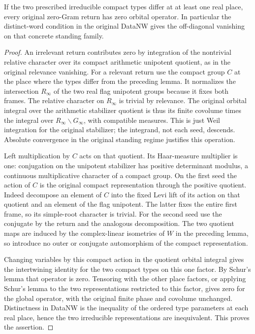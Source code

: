 \begin{theorem}
\label{thm:flag-offdiagonal-zero-gram}
If the two prescribed irreducible compact types differ at at
least one real place, every original zero-Gram return has
zero orbital operator. In particular the distinct-word
condition in the original DataNW gives the off-diagonal
vanishing on that concrete standing family.
\end{theorem}
\begin{proof}
An irrelevant return contributes zero by integration of the
nontrivial relative character over its compact arithmetic
unipotent quotient, as in the original relevance vanishing.
For a relevant return use the compact group \(C\) at the
place where the types differ from the preceding lemma.
It normalizes the intersection \(R_\infty\) of the two
real flag unipotent groups because it fixes both frames.
The relative character on \(R_\infty\) is trivial by
relevance. The original orbital integral over the arithmetic
stabilizer quotient is thus its finite covolume times
the integral over \(R_\infty\backslash G_\infty\), with
compatible measures. This is just Weil integration for
the original stabilizer; the integrand, not each seed,
descends. Absolute convergence in the original standing
regime justifies this operation.

Left multiplication by \(C\) acts on that quotient.
Its Haar-measure multiplier is one: conjugation on the
unipotent stabilizer has positive determinant modulus,
a continuous multiplicative character of a compact group.
On the first seed the action of \(C\) is the original
compact representation through the positive quotient.
Indeed decompose an element of \(C\) into the fixed Levi
lift of its action on that quotient and an element of
the flag unipotent. The latter fixes the entire first
frame, so its simple-root character is trivial.
For the second seed use the conjugate by the return and
the analogous decomposition. The two quotient maps are
induced by the complex-linear isometries of \(W\) in the
preceding lemma, so introduce no outer or conjugate
automorphism of the compact representation.

Changing variables by this compact action in the
quotient orbital integral gives the intertwining identity
for the two compact types on this one factor. By Schur's
lemma that operator is zero. Tensoring with the other
place factors, or applying Schur's lemma to the two
representations restricted to this factor, gives zero for
the global operator, with the original finite phase and
covolume unchanged. Distinctness in DataNW is the
inequality of the ordered type parameters at each real
place, hence the two irreducible representations are
inequivalent. This proves the assertion.
\end{proof}

